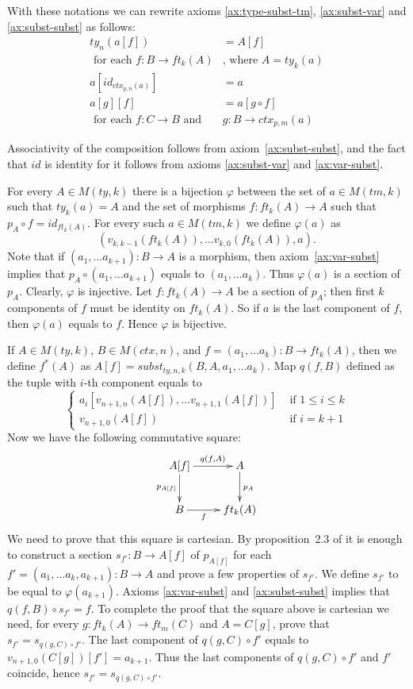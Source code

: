 \documentclass[reqno]{amsart}
\theoremstyle{definition}
\theoremstyle{remark}
\numberwithin{figure}{section}
\begin{document}
With these notations we can rewrite axioms \eqref{ax:type-subst-tm}, \eqref{ax:subst-var} and \eqref{ax:subst-subst} as follows:
\begin{align*}
ty_n(a[f]) & = A[f] \\
\text{ for each } f : B \to ft_k(A) & \text{, where } A = ty_k(a) \\
a[id_{ctx_{p,n}(a)}] & = a \\
a[g][f] & = a[g \circ f] \\
\text{ for each } f : C \to B \text{ and } & g : B \to ctx_{p,m}(a)
\end{align*}

Associativity of the composition follows from axiom~\eqref{ax:subst-subst}, and the fact that $id$ is identity for it follows from axioms \eqref{ax:subst-var} and \eqref{ax:var-subst}.

For every $A \in M(ty,k)$ there is a bijection $\varphi$ between the set of $a \in M(tm,k)$ such that $ty_k(a) = A$
    and the set of morphisms $f : ft_k(A) \to A$ such that $p_A \circ f = id_{ft_k(A)}$.
For every such $a \in M(tm,k)$ we define $\varphi(a)$ as
\[ (v_{k,k-1}(ft_k(A)), \ldots v_{k,0}(ft_k(A)), a). \]
Note that if $(a_1, \ldots a_{k+1}) : B \to A$ is a morphism, then axiom~\eqref{ax:var-subst} implies that $p_A \circ (a_1, \ldots a_{k+1})$ equals to $(a_1, \ldots a_k)$.
Thus $\varphi(a)$ is a section of $p_A$.
Clearly, $\varphi$ is injective.
Let $f : ft_k(A) \to A$ be a section of $p_A$; then first $k$ components of $f$ must be identity on $ft_k(A)$.
So if $a$ is the last component of $f$, then $\varphi(a)$ equals to $f$.
Hence $\varphi$ is bijective.

If $A \in M(ty,k)$, $B \in M(ctx,n)$, and $f = (a_1, \ldots a_k) : B \to ft_k(A)$, then we define $f^*(A)$ as $A[f] = subst_{ty,n,k}(B, A, a_1, \ldots a_k)$.
Map $q(f,B)$ defined as the tuple with $i$-th component equals to
\[ \left\{
  \begin{array}{lr}
    a_i[v_{n+1,n}(A[f]), \ldots v_{n+1,1}(A[f])] & \text{ if } 1 \leq i \leq k \\
    v_{n+1,0}(A[f])                              & \text{ if } i = k+1
  \end{array}
\right. \]
Now we have the following commutative square:
\[ \xymatrix{ A[f] \ar[r]^-{q(f,A)} \ar[d]_{p_{A[f]}} & A \ar[d]^{p_A} \\
              B \ar[r]_-f                             & ft_k(A)
            } \]
We need to prove that this square is cartesian.
By proposition~2.3 of \cite{c-systems} it is enough to construct a section $s_{f'} : B \to A[f]$ of $p_{A[f]}$
    for each $f' = (a_1, \ldots a_k, a_{k+1}) : B \to A$ and prove a few properties of $s_{f'}$.
We define $s_{f'}$ to be equal to $\varphi(a_{k+1})$.
Axioms \eqref{ax:var-subst} and \eqref{ax:subst-subst} implies that $q(f,B) \circ s_{f'} = f$.
To complete the proof that the square above is cartesian we need, for every $g : ft_k(A) \to ft_m(C)$ and $A = C[g]$, prove that $s_{f'} = s_{q(g,C) \circ f'}$.
The last component of $q(g,C) \circ f'$ equals to $v_{n+1,0}(C[g])[f'] = a_{k+1}$.
Thus the last components of $q(g,C) \circ f'$ and $f'$ coincide, hence $s_{f'} = s_{q(g,C) \circ f'}$.
\end{document}
